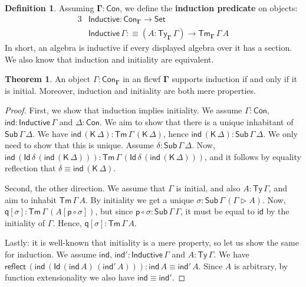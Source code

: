 \documentclass[12pt,a4paper,twoside,openany]{book}
\theoremstyle{remark}
\theoremstyle{definition}
\newtheorem{mydefinition}{Definition}
\theoremstyle{theorem}
\newtheorem{theorem}{Theorem}
\newcommand{\ms}[1]{\mathsf{#1}}
\newcommand{\bs}[1]{\boldsymbol{#1}}
\newcommand{\reflect}{\mathsf{reflect}}
\newcommand{\id}{\mathsf{id}}
\newcommand{\Con}{\mathsf{Con}}
\newcommand{\Sub}{\mathsf{Sub}}
\newcommand{\Tm}{\mathsf{Tm}}
\newcommand{\Ty}{\mathsf{Ty}}
\newcommand{\Id}{\mathsf{Id}}
\newcommand{\ra}{\rightarrow}
\newcommand{\Set}{\mathsf{Set}}
\newcommand{\ext}{\triangleright}
\newcommand{\p}{\mathsf{p}}
\newcommand{\q}{\mathsf{q}}
\newcommand{\K}{\mathsf{K}}
\newcommand{\bCon}{\bs{\Con}}
\newcommand{\bGamma}{\bs{\Gamma}}
\newcommand{\Inductive}{\ms{Inductive}}
\newcommand{\defn}{:\equiv}
\begin{document}
\begin{mydefinition}
\label{def:induction-predicate}
Assuming $\bGamma : \bCon$, we define the \textbf{induction predicate} on
objects:
\begin{alignat*}{3}
  & \Inductive : \Con_{\bGamma} \to \Set\\
  & \Inductive\,\Gamma \defn (A : \Ty_{\bGamma}\,\Gamma)\ra \Tm_{\bGamma}\,\Gamma\,A
\end{alignat*}
In short, an algebra is inductive if every displayed algebra over it has a
section. We also know that induction and initiality are equivalent.
\end{mydefinition}

\begin{theorem}\label{thm:initiality-induction}
An object $\Gamma : \Con_{\bGamma}$ in an flcwf $\bGamma$ supports induction if
and only if it is initial. Moreover, induction and initiality are both mere
properties.
\end{theorem}

\begin{proof}
First, we show that induction implies initiality. We assume $\Gamma : \Con$,
$\ms{ind} : \ms{Inductive}\,\Gamma$ and $\Delta : \Con$. We aim to show that
there is a unique inhabitant of $\Sub\,\Gamma\,\Delta$. We have
$\ms{ind}\,(\K\,\Delta) : \Tm\,\Gamma\,(\K\,\Delta)$, hence
$\ms{ind}\,(\K\,\Delta) : \Sub\,\Gamma\,\Delta$. We only need to show that this
is unique.  Assume $\delta : \Sub\,\Gamma\,\Delta$. Now,
$\ms{ind}\,(\Id\,\delta\,(\ms{ind}\,(\K\,\Delta))) :
\Tm\,\Gamma\,(\Id\,\delta\,(\ms{ind}\,(\K\,\Delta)))$, and it follows by
equality reflection that $\delta \equiv \ms{ind}\,(\K\,\Delta)$.

Second, the other direction. We assume that $\Gamma$ is initial, and also $A :
\Ty\,\Gamma$, and aim to inhabit $\Tm\,\Gamma\,A$. By initiality we get a unique
$\sigma : \Sub\,\Gamma\,(\Gamma \ext A)$. Now, $\q[\sigma] : \Tm\,\Gamma\,(A[\p \circ \sigma])$,
but since $\p \circ \sigma : \Sub\,\Gamma\,\Gamma$, it must be equal to $\id$ by the initiality
of $\Gamma$. Hence, $\q[\sigma] : \Tm\,\Gamma\,A$.

Lastly: it is well-known that initiality is a mere property, so let us show the
same for induction.  We assume $\ms{ind},\,\ms{ind'} : \ms{Inductive}\,\Gamma$
and $A : \Ty\,\Gamma$. We have
$\reflect\,(\ms{ind}\,(\Id\,(\ms{ind}\,A)\,(\ms{ind'}\,A))) : \ms{ind}\,A \equiv
\ms{ind'}\,A$. Since $A$ is arbitrary, by function extensionality we also have $\ms{ind} \equiv \ms{ind'}$.
\end{proof}
\end{document}
